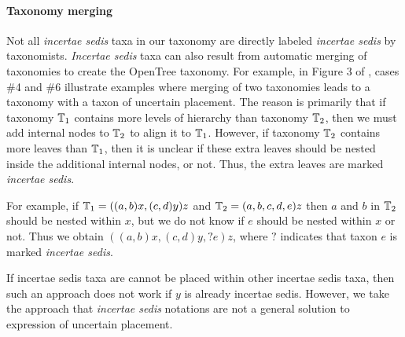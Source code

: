\documentclass[english]{article}
\begin{document}
\paragraph{Taxonomy merging}

Not all \emph{incertae sedis} taxa in our taxonomy are directly
labeled \emph{incertae sedis} by taxonomists.
\emph{Incertae sedis}
taxa can also result from automatic merging of taxonomies to create
the OpenTree taxonomy.
For example, in Figure 3 of
\citet{rees2017automated}, cases \#4 and \#6 illustrate examples where
merging of two taxonomies leads to a taxonomy with a taxon of
uncertain placement.
The reason is primarily that if taxonomy
$\mbox{\ensuremath{\mathbb{T}}}_{1}$ contains more levels of hierarchy than taxonomy
$\mbox{\ensuremath{\mathbb{T}}}_{2}$, then we must add internal nodes to $\mbox{\ensuremath{\mathbb{T}}}_{2}$ to
align it to $\mbox{\ensuremath{\mathbb{T}}}_{1}$.
However, if taxonomy $\mbox{\ensuremath{\mathbb{T}}}_{2}$
contains more leaves than $\mbox{\ensuremath{\mathbb{T}}}_{1}$, then it is unclear if these
extra leaves should be nested inside the additional internal nodes, or
not.
Thus, the extra leaves are marked \emph{incertae sedis}.

For example, if $\mbox{\ensuremath{\mathbb{T}}}_{1}=((a,b)x,(c,d)y)z$ and
$\mbox{\ensuremath{\mathbb{T}}}_{2}=(a,b,c,d,e)z$ then $a$ and $b$ in $\mbox{\ensuremath{\mathbb{T}}}_{2}$
should be nested within $x$, but we do not know if $e$ should be
nested within $x$ or not.
Thus we obtain $((a,b)x,(c,d)y,?e)z$, where
$?$ indicates that taxon $e$ is marked \emph{incertae sedis}.

If incertae sedis taxa are cannot be placed within other incertae
sedis taxa, then such an approach does not work if $y$ is already
incertae sedis.
However, we take the approach that \emph{incertae
sedis} notations are not a general solution to expression of uncertain
placement.





\end{document}
